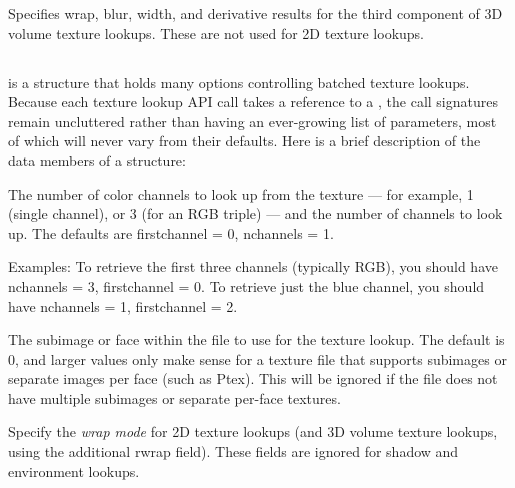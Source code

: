 Specifies wrap, blur, width, and derivative results for the third
component of 3D volume texture lookups.  These are not used for 2D
texture lookups.
\apiend

\subsection{\TextureOptions}

\TextureOptions is a structure that holds many options controlling
batched texture lookups.  Because each texture lookup API call takes
a reference to a \TextureOptions, the call signatures remain uncluttered
rather than having an ever-growing list of parameters, most of which
will never vary from their defaults.  Here is a brief description of
the data members of a \TextureOptions structure:

The number of color channels to look up from the texture --- for
example, 1 (single channel), or 3 (for an RGB triple) --- and the number
of channels to look up.  The defaults are firstchannel = 0, nchannels =
1.

Examples: To retrieve the first three channels (typically RGB), you
should have nchannels = 3, firstchannel = 0.  To retrieve just the blue
channel, you should have nchannels = 1, firstchannel = 2.
\apiend

The subimage or face within the file to use for the texture lookup.
The default is 0, and larger values only make sense for a texture file
that supports subimages or separate images per face (such as Ptex).
This will be ignored if the file does not have multiple subimages or
separate per-face textures.
\apiend

Specify the \emph{wrap mode} for 2D texture lookups (and 3D volume
texture lookups, using the additional {\cf rwrap} field).  These fields
are ignored for shadow and environment lookups.

